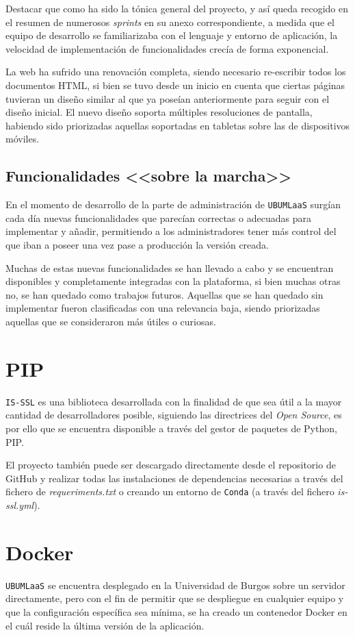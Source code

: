 Destacar que como ha sido la tónica general del proyecto, y así queda recogido en el resumen de numerosos \textit{sprints} en su anexo correspondiente, a medida que el equipo de desarrollo se familiarizaba con el lenguaje y entorno de aplicación, la velocidad de implementación de funcionalidades crecía de forma exponencial.

La web ha sufrido una renovación completa, siendo necesario re-escribir todos los documentos HTML, si bien se tuvo desde un inicio en cuenta que ciertas páginas tuvieran un diseño similar al que ya poseían anteriormente para seguir con el diseño inicial. El nuevo diseño soporta múltiples resoluciones de pantalla, habiendo sido priorizadas aquellas soportadas en tabletas sobre las de dispositivos móviles.

\subsection{Funcionalidades <<sobre la marcha>>}
En el momento de desarrollo de la parte de administración de \texttt{UBUMLaaS} surgían cada día nuevas funcionalidades que parecían correctas o adecuadas para implementar y añadir, permitiendo a los administradores tener más control del que iban a poseer una vez pase a producción la versión creada.

Muchas de estas nuevas funcionalidades se han llevado a cabo y se encuentran disponibles y completamente integradas con la plataforma, si bien muchas otras no, se han quedado como trabajos futuros. Aquellas que se han quedado sin implementar fueron clasificadas con una relevancia baja, siendo priorizadas aquellas que se consideraron más útiles o curiosas.

\section{PIP}
\texttt{IS-SSL} es una biblioteca desarrollada con la finalidad de que sea útil a la mayor cantidad de desarrolladores posible, siguiendo las directrices del \textit{Open Source}, es por ello que se encuentra disponible a través del gestor de paquetes de Python, PIP. 

El proyecto también puede ser descargado directamente desde el repositorio de GitHub y realizar todas las instalaciones de dependencias necesarias a través del fichero de \textit{requeriments.txt} o creando un entorno de \texttt{Conda} (a través del fichero \textit{is-ssl.yml}).

\section{Docker}
\texttt{UBUMLaaS} se encuentra desplegado en la Universidad de Burgos sobre un servidor directamente, pero con el fin de permitir que se despliegue en cualquier equipo y que la configuración específica sea mínima, se ha creado un contenedor Docker en el cuál reside la última versión de la aplicación. 

